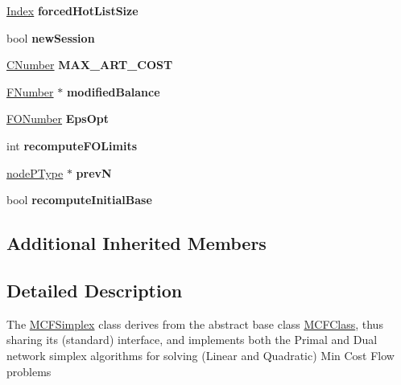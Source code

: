 \begin{DoxyCompactItemize}
\mbox{\hyperlink{class_m_c_f_class_ad53d6229d7ec28555a9c9c2fd9abf773}{Index}} {\bfseries forced\+Hot\+List\+Size}
\item 
\mbox{\label{class_m_c_f_simplex_ade47d7e0d1b4d2ac75845e17bf1c2348}} 
bool {\bfseries new\+Session}
\item 
\mbox{\label{class_m_c_f_simplex_a5ff97f7dae1d724a8e31558f3454cc10}} 
\mbox{\hyperlink{class_m_c_f_class_a24d0627ba8213afe1ec4ebeb4508e8f1}{C\+Number}} {\bfseries M\+A\+X\+\_\+\+A\+R\+T\+\_\+\+C\+O\+ST}
\item 
\mbox{\label{class_m_c_f_simplex_a1f685cbda4fe0a2e6fa4980ca14798e8}} 
\mbox{\hyperlink{class_m_c_f_class_aeea3e5951d222b2a8e57de1b4246a909}{F\+Number}} $\ast$ {\bfseries modified\+Balance}
\item 
\mbox{\label{class_m_c_f_simplex_ab2789e912f7805aafb7f6b327bb7c379}} 
\mbox{\hyperlink{class_m_c_f_class_af5ee7b3099b0bc780a6a4b43629488fa}{F\+O\+Number}} {\bfseries Eps\+Opt}
\item 
\mbox{\label{class_m_c_f_simplex_a38aa523a8be3c0dd00f9c0253f5ed78a}} 
int {\bfseries recompute\+F\+O\+Limits}
\item 
\mbox{\label{class_m_c_f_simplex_afda2b813f21a8832ea8e4fda8d2a01b9}} 
\mbox{\hyperlink{struct_m_c_f_simplex_1_1node_p_type}{node\+P\+Type}} $\ast$ {\bfseries prevN}
\item 
\mbox{\label{class_m_c_f_simplex_a842a90d6d5a828aaf1efb8490ab5eafd}} 
bool {\bfseries recompute\+Initial\+Base}
\end{DoxyCompactItemize}
\subsection*{Additional Inherited Members}


\subsection{Detailed Description}
The \mbox{\hyperlink{class_m_c_f_simplex}{M\+C\+F\+Simplex}} class derives from the abstract base class \mbox{\hyperlink{class_m_c_f_class}{M\+C\+F\+Class}}, thus sharing its (standard) interface, and implements both the Primal and Dual network simplex algorithms for solving (Linear and Quadratic) Min Cost Flow problems 

